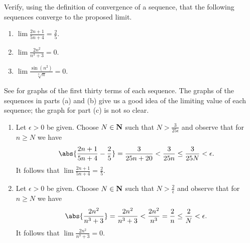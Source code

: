 \documentclass{lew98_solutions}
\begin{document}
\begin{exercise}
\label{ex:2.2.2}
    Verify, using the definition of convergence of a sequence, that the following sequences converge to the proposed limit.
    \begin{enumerate}
        \item \( \lim \tfrac{2n + 1}{5n + 4} = \tfrac{2}{5} \).

        \item \( \lim \tfrac{2n^2}{n^3 + 3} = 0 \).

        \item \( \lim \tfrac{\sin(n^2)}{\sqrt[3]{n}} = 0 \).
    \end{enumerate}
\end{exercise}

\begin{solution}
    See  for graphs of the first thirty terms of each sequence. The graphs of the sequences in parts (a) and (b) give us a good idea of the limiting value of each sequence; the graph for part (c) is not so clear.
    \begin{enumerate}
        \item Let \( \epsilon > 0 \) be given. Choose \( N \in \mathbf{N} \) such that \( N > \tfrac{3}{25 \epsilon} \) and observe that for \( n \geq N \) we have
        \[
            \abs{\frac{2n + 1}{5n + 4} - \frac{2}{5}} = \frac{3}{25n + 20} < \frac{3}{25n} \leq \frac{3}{25N} < \epsilon.
        \]
        It follows that \( \lim \tfrac{2n + 1}{5n + 4} = \tfrac{2}{5} \).

        \item Let \( \epsilon > 0 \) be given. Choose \( N \in \mathbf{N} \) such that \( N > \tfrac{2}{\epsilon} \) and observe that for \( n \geq N \) we have
        \[
            \abs{\frac{2n^2}{n^3 + 3}} = \frac{2n^2}{n^3 + 3} < \frac{2n^2}{n^3} = \frac{2}{n} \leq \frac{2}{N} < \epsilon.
        \]
        It follows that \( \lim \tfrac{2n^2}{n^3 + 3} = 0 \).


\end{enumerate}
\end{solution}
\end{document}
